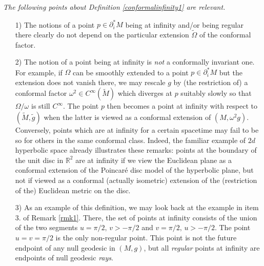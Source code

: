 \begin{remark}
\label{rmk3}
{\em The following points about Definition \ref{conformalinfinity1} are relevant.
\begin{itemize}
\item[1)] The notions of a point $p \in \partial^{*}_i M$ being at infinity and/or being regular there clearly do not depend on the particular extension $\tilde{\Omega}$ of the conformal factor.
\item[2)] The notion of a point being at infinity is {\em not} a conformally invariant one. For example, if $\Omega$ can be smoothly extended to a point $p \in \partial^{*}_i M$ but the extension does not vanish there, we may rescale $g$ by (the restriction of) a conformal factor $\omega^2 \in C^{\infty}(\tilde{M})$ which diverges at $p$ suitably slowly so that $\Omega/\omega$ is still $C^{\infty}$. The point $p$ then becomes a point at infinity with respect to $(\tilde{M}, \tilde{g})$ when the latter is viewed as a conformal extension of $(M,\omega^2g)$. Conversely, points which are at infinity for a certain spacetime may fail to be so for others in the same conformal class. Indeed, the familiar example of $2d$ hyperbolic space already illustrates these remarks: points at the boundary of the unit disc in $\mathbb{R}^2$ are at infinity if we view the Euclidean plane as a conformal extension of the Poincar\'{e} disc model of the hyperbolic plane, but not if viewed as a conformal (actually isometric) extension of the (restriction of the) Euclidean metric on the disc.
\item[3)] As an example of this definition, we may look back at the example in item 3. of Remark \ref{rmk1}. There, the set of points at infinity consists of the union of the two segments $u=\pi/2,\, v>-\pi/2$ and $v=\pi/2, \, u> -\pi/2$. The point $u=v= \pi/2$ is the only non-regular point. This point is not the future endpoint of any null geodesic in $(M,g)$, but all {\em regular} points at infinity are endpoints of null geodesic {\em rays}.
\end{itemize}
}
\end{remark}

